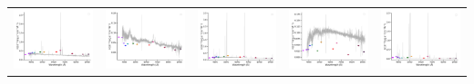 \begin{center}
\begin{longtable}{l l l l l }
    \includegraphics[width=0.19\linewidth, clip]{Figs/Figs-sdss/spec-1829-53494-0282-SPLUS-n05n53-005761.pdf} & \includegraphics[width=0.19\linewidth, clip]{Figs/Figs-sdss/spec-1901-53261-0086-SPLUS-s02s13-032892.pdf} & \includegraphics[width=0.19\linewidth, clip]{Figs/Figs-sdss/spec-1919-53240-0073-STRIPE82-0111-068928.pdf} & \includegraphics[width=0.19\linewidth, clip]{Figs/Figs-sdss/spec-1919-53240-0621-STRIPE82-0112-020655.pdf} & \includegraphics[width=0.19\linewidth, clip]{Figs/Figs-sdss/spec-2568-54153-0481-SPLUS-n01s27-050095.pdf} \\

\end{longtable}
\end{center}
